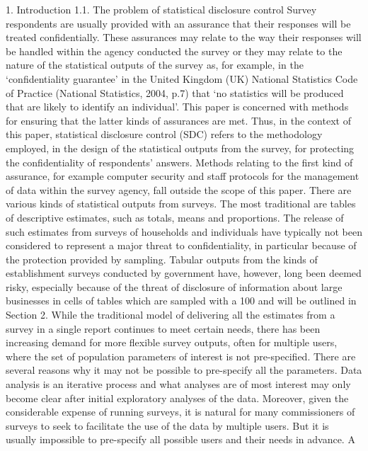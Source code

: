 1. Introduction 
1.1. The problem of statistical disclosure control
Survey respondents are usually provided with an assurance that their responses will 
be treated confidentially. These assurances may relate to the way their responses will be 
handled within the agency conducted the survey or they may relate to the nature of the 
statistical outputs of the survey as, for example, in the ‘confidentiality guarantee’ in the 
United Kingdom (UK) National Statistics Code of Practice (National Statistics, 2004, 
p.7) that ‘no statistics will be produced that are likely to identify an individual’. This 
paper is concerned with methods for ensuring that the latter kinds of assurances are met. 
Thus, in the context of this paper, statistical disclosure control (SDC) refers to the 
methodology employed, in the design of the statistical outputs from the survey, for 
protecting the confidentiality of respondents’ answers. Methods relating to the first kind 
of assurance, for example computer security and staff protocols for the management of 
data within the survey agency, fall outside the scope of this paper. 
There are various kinds of statistical outputs from surveys. The most traditional are 
tables of descriptive estimates, such as totals, means and proportions. The release of such
estimates from surveys of households and individuals have typically not been considered 
to represent a major threat to confidentiality, in particular because of the protection 
provided by sampling. Tabular outputs from the kinds of establishment surveys 
conducted by government have, however, long been deemed risky, especially because of 
the threat of disclosure of information about large businesses in cells of tables which are 
sampled with a 100%
and will be outlined in Section 2. 
 While the traditional model of delivering all the estimates from a survey in a single 
report continues to meet certain needs, there has been increasing demand for more 
flexible survey outputs, often for multiple users, where the set of population parameters 
of interest is not pre-specified. There are several reasons why it may not be possible to 
pre-specify all the parameters. Data analysis is an iterative process and what analyses are 
of most interest may only become clear after initial exploratory analyses of the data. 
Moreover, given the considerable expense of running surveys, it is natural for many 
commissioners of surveys to seek to facilitate the use of the data by multiple users. But it 
is usually impossible to pre-specify all possible users and their needs in advance. A 
